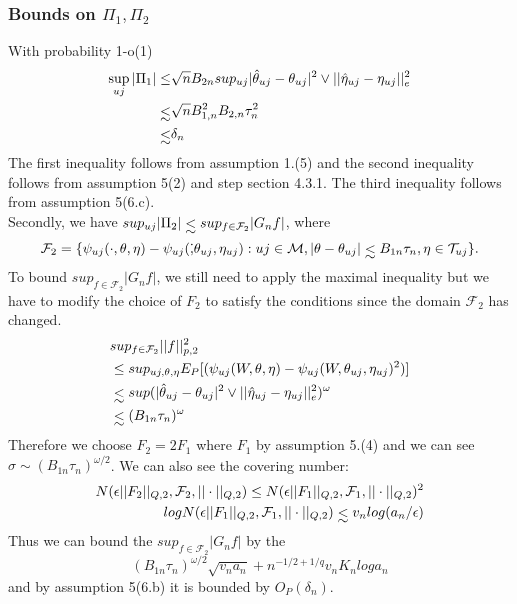 \documentclass{article}
\makeatletter
\let\originallesssim\lesssim
\DeclareRobustCommand{\lesssim}{%
  \mathrel{\mathpalette\lowersim\originallesssim}%
}
\newcommand{\lowersim}[2]{%
  \sbox\z@{$#1<$}%
  \raisebox{-\dimexpr\height-\ht\z@}{$\m@th#1#2$}%
}
\makeatother
\begin{document}
\subsubsection{Bounds on $\Pi_1,\Pi_2$}
With probability 1-o(1)
\begin{align*}
   \sup_{uj}|\Pi_1|\leq& \sqrt{n}B_{2n}sup_{uj}|\hat{\theta}_{uj}-\theta_{uj}|^2\vee ||\hat{\eta}_{uj}-\eta_{uj}||_e^2 \\
   \lesssim & \sqrt{n}B^2_{1,n}B_{2,n}\tau_n^2\\
   \lesssim& \delta_n
\end{align*}
The first inequality follows from assumption 1.(5) and the second inequality follows from assumption 5(2) and step section 4.3.1. The third inequality follows from assumption 5(6.c). \\
Secondly, we have $sup_{uj}|\Pi_2|\lesssim sup_{f\in \mathcal{F}_2}|G_n f|$, where
\begin{equation}
    \mathcal{F}_2=\{\psi_{uj}(\cdot,\theta,\eta)-\psi_{uj}(\dot,\theta_{uj},\eta_{uj}):uj\in\mathcal{M},|\theta-\theta_{uj}|\lesssim B_{1n}\tau_n, \eta\in\mathcal{T}_{uj} \}.
\end{equation}
 To bound $sup_{f\in \mathcal{F}_2}|G_n f|$, we still need to apply the maximal inequality but we have to modify the choice of $F_2$ to satisfy the conditions since the domain $\mathcal{F}_2$ has changed. 
 \begin{align*}
     &sup_{f\in\mathcal{F}_2}||f||_{p,2}^2\\
     &\leq sup_{uj,\theta,\eta}E_P[(\psi_{uj}(W,\theta,\eta)-\psi_{uj}(W,\theta_{uj},\eta_{uj})^2)]\\
     &\lesssim sup (|\hat{\theta}_{uj}-\theta_{uj}|^2\vee ||\hat{\eta}_{uj}-\eta_{uj}||_e^2 )^\omega\\
     &\lesssim (B_{1n}\tau_n)^\omega
 \end{align*}
 Therefore we choose $F_2=2F_1$ where $F_1$ by assumption 5.(4) and we can see $\sigma\sim (B_{1n}\tau_n)^{\omega/2}$.
 We can also see the covering number:
\begin{align*}
    N(\epsilon||F_2||_{Q,2},\mathcal{F}_2,||\cdot||_{Q,2})\leq N(\epsilon||F_1||_{Q,2},\mathcal{F}_1,||\cdot||_{Q,2})^2\\
    logN(\epsilon||F_1||_{Q,2},\mathcal{F}_1,||\cdot||_{Q,2})\lesssim v_nlog(a_n/\epsilon)
\end{align*}
 Thus we can bound the  $sup_{f\in \mathcal{F}_2}|G_n f|$ by the 
 \begin{equation}
     (B_{1n}\tau_n)^{\omega/2}\sqrt{v_n a_n}+n^{-1/2+1/q}v_n K_n log a_n
 \end{equation}
 and by assumption 5(6.b) it is bounded by $O_P(\delta_n)$.
\end{document}
